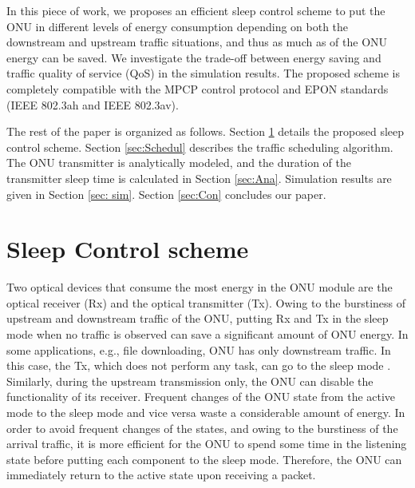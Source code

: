 \documentclass[11pt,english,12pt,onecolumn, draftcls]{IEEEtran}
\theoremstyle{plain}
\theoremstyle{definition}
\begin{document}
In this piece of work, we proposes an efficient sleep control scheme to put the ONU in different levels of energy consumption depending on both the downstream and upstream traffic situations, and thus as much as  of the ONU energy can be saved. We investigate the trade-off between energy saving and traffic quality of service (QoS) in the simulation results. The proposed scheme is completely compatible with the MPCP control protocol and EPON standards (IEEE 802.3ah and IEEE 802.3av).


The rest of the paper is organized as follows. Section \ref{sec: Model} details the proposed sleep control scheme. Section \ref{sec:Schedul} describes the traffic scheduling algorithm. The ONU transmitter is analytically modeled, and the duration of the transmitter sleep time is calculated in Section \ref{sec:Ana}. Simulation results are given in Section \ref{sec: sim}. Section \ref{sec:Con} concludes our paper.

\vspace{-0.1in}
\section{Sleep Control scheme}
\label{sec: Model}
Two optical devices that consume the most energy in the ONU module are the optical receiver (Rx) and the optical transmitter (Tx). Owing to the burstiness of upstream and downstream traffic of the ONU, putting Rx and Tx in the sleep mode when no traffic is observed can save a significant amount of ONU energy. In some applications, e.g., file downloading, ONU has only downstream traffic. In this case, the Tx, which does not perform any task, can go to the sleep mode \cite{Mina2013}. Similarly, during the upstream transmission only, the ONU can disable the functionality of its receiver. Frequent changes of the ONU state from the active mode to the sleep mode and vice versa waste a considerable amount of energy. In order to avoid frequent changes of the states, and owing to the burstiness of the arrival traffic, it is more efficient for the ONU to spend some time in the listening state before putting each component to the sleep mode. Therefore, the ONU can immediately return to the active state upon receiving a packet.
\end{document}
